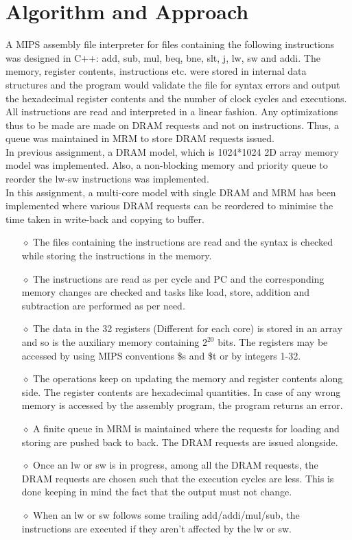 \documentclass{article} %
\begin{document}
\section{Algorithm and Approach}
A MIPS assembly file interpreter for files containing the following instructions was designed in C++: add, sub, mul, beq, bne, slt, j, lw, sw and addi. The memory, register contents, instructions etc. were stored in internal data structures and the program would validate the file for syntax errors and output the hexadecimal register contents and the number of clock cycles and executions. All instructions are read and interpreted in a linear fashion. Any optimizations thus to be made are made on DRAM requests and not on instructions. Thus, a queue was maintained in MRM to store DRAM requests issued.
\\In previous assignment, a DRAM model, which is 1024*1024 2D array memory model was implemented. Also, a non-blocking memory and priority queue to reorder the lw-sw instructions was implemented.
\\In this assignment, a multi-core model with single DRAM and MRM has been implemented where various DRAM requests can be reordered to minimise the time taken in write-back and copying to buffer.
\begin{itemize}
    \item[$\diamond$] The files containing the instructions are read and the syntax is checked while storing the instructions in the memory.
    \item[$\diamond$] The instructions are read as per cycle and PC and the corresponding memory changes are checked and tasks like load, store, addition and subtraction are performed as per need.
    \item[$\diamond$] The data in the 32 registers (Different for each core) is stored in an array and so is the auxiliary memory containing $2^{20}$ bits. The registers may be accessed by using MIPS conventions \$s and \$t or by integers 1-32.
    \item[$\diamond$] The operations keep on updating the memory and register contents along side. The register contents are hexadecimal quantities. In case of any wrong memory is accessed by the assembly program, the program returns an error.
    \item[$\diamond$] A finite queue in MRM is maintained where the requests for loading and storing are pushed back to back. The DRAM requests are issued alongside.
    \item[$\diamond$] Once an lw or sw is in progress, among all the DRAM requests, the DRAM requests are chosen such that the execution cycles are less. This is done keeping in mind the fact that the output must not change.
    \item[$\diamond$] When an lw or sw follows some trailing add/addi/mul/sub, the instructions are executed if they aren't affected by the lw or sw.
\end{itemize}
\end{document}
